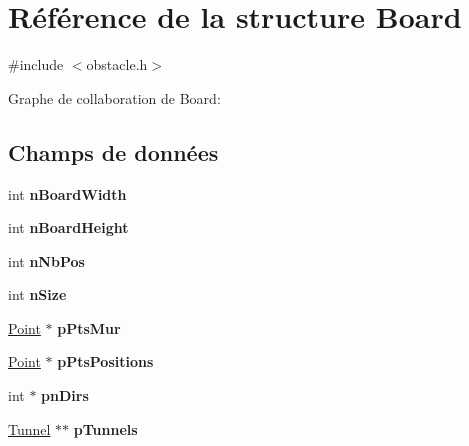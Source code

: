 \hypertarget{struct_board}{}\section{Référence de la structure Board}
\label{struct_board}


{\ttfamily \#include $<$obstacle.\+h$>$}



Graphe de collaboration de Board\+:
\subsection*{Champs de données}
\begin{DoxyCompactItemize}
\item 
int {\bfseries n\+Board\+Width}\hypertarget{struct_board_aad80ef820a78438beab291c8afd11537}{}\label{struct_board_aad80ef820a78438beab291c8afd11537}

\item 
int {\bfseries n\+Board\+Height}\hypertarget{struct_board_a7db097fc54460ad93ba4e27f87c6e415}{}\label{struct_board_a7db097fc54460ad93ba4e27f87c6e415}

\item 
int {\bfseries n\+Nb\+Pos}\hypertarget{struct_board_a5144d35dd645892013c497cebb2e9b1f}{}\label{struct_board_a5144d35dd645892013c497cebb2e9b1f}

\item 
int {\bfseries n\+Size}\hypertarget{struct_board_a69eba13a7543e1379e705b54823531a9}{}\label{struct_board_a69eba13a7543e1379e705b54823531a9}

\item 
\hyperlink{struct_point}{Point} $\ast$ {\bfseries p\+Pts\+Mur}\hypertarget{struct_board_a15b7375925a07516d82c52733ec16874}{}\label{struct_board_a15b7375925a07516d82c52733ec16874}

\item 
\hyperlink{struct_point}{Point} $\ast$ {\bfseries p\+Pts\+Positions}\hypertarget{struct_board_ab251fa666350a133b8b089a26c93a623}{}\label{struct_board_ab251fa666350a133b8b089a26c93a623}

\item 
int $\ast$ {\bfseries pn\+Dirs}\hypertarget{struct_board_a1548ed096f3589f9a471cfad9795f6cd}{}\label{struct_board_a1548ed096f3589f9a471cfad9795f6cd}

\item 
\hyperlink{struct_tunnel}{Tunnel} $\ast$$\ast$ {\bfseries p\+Tunnels}\hypertarget{struct_board_ad6d98f6eaea3e9407a8a00127a6d5580}{}\label{struct_board_ad6d98f6eaea3e9407a8a00127a6d5580}


\end{DoxyCompactItemize}
